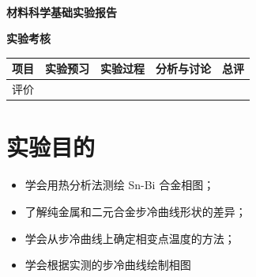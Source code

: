\documentclass[a4paper,utf8]{article}
\begin{document}
\begin{center}
    {\mbox{}\\[7em]\bfseries\songti%
    材料科学基础实验报告}\\[34mm]
    {\bfseries\songti
    实验考核\\[3mm]
    \extrarowheight=3mm
    \begin{tabularx}{150mm}{|X|X|X|X|X|}\hline
        \hfil 项目 \hfil  & \hfil 实验预习 \hfil & \hfil 实验过程 \hfil & \hfil 分析与讨论 \hfil & \hfil 总评 \hfil \\[3mm] \hline
        \hfil 评价 \hfil &  &  &  &  \\[3mm] \hline
    \end{tabularx}
    }
\end{center}
\newpage
\section{实验目的}
    \begin{itemize}
        \item 学会用热分析法测绘 Sn-Bi 合金相图；
        \item 了解纯金属和二元合金步冷曲线形状的差异；
        \item 学会从步冷曲线上确定相变点温度的方法；
        \item 学会根据实测的步冷曲线绘制相图
    \end{itemize}
\end{document}
